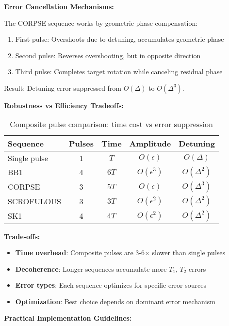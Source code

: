 \documentclass[11pt,a4paper]{article}
\theoremstyle{definition}
\theoremstyle{remark}
\begin{document}
\textbf{Error Cancellation Mechanisms:}

The CORPSE sequence works by geometric phase compensation:
\begin{enumerate}
    \item First pulse: Overshoots due to detuning, accumulates geometric phase
    \item Second pulse: Reverses overshooting, but in opposite direction
    \item Third pulse: Completes target rotation while canceling residual phase
\end{enumerate}

Result: Detuning error suppressed from $O(\Delta)$ to $O(\Delta^3)$.

\textbf{Robustness vs Efficiency Tradeoffs:}

\begin{table}[h]
\centering
\begin{tabular}{lcccc}
\toprule
\textbf{Sequence} & \textbf{Pulses} & \textbf{Time} & \textbf{Amplitude} & \textbf{Detuning} \\
\midrule
Single pulse & 1 & $T$ & $O(\epsilon)$ & $O(\Delta)$ \\
BB1 & 4 & $6T$ & $O(\epsilon^3)$ & $O(\Delta^2)$ \\
CORPSE & 3 & $5T$ & $O(\epsilon)$ & $O(\Delta^3)$ \\
SCROFULOUS & 3 & $3T$ & $O(\epsilon^2)$ & $O(\Delta^2)$ \\
SK1 & 4 & $4T$ & $O(\epsilon^2)$ & $O(\Delta^2)$ \\
\bottomrule
\end{tabular}
\caption{Composite pulse comparison: time cost vs error suppression}
\end{table}

\textbf{Trade-offs:}
\begin{itemize}
    \item \textbf{Time overhead}: Composite pulses are 3-6× slower than single pulses
    \item \textbf{Decoherence}: Longer sequences accumulate more $T_1$, $T_2$ errors
    \item \textbf{Error types}: Each sequence optimizes for specific error sources
    \item \textbf{Optimization}: Best choice depends on dominant error mechanism
\end{itemize}

\textbf{Practical Implementation Guidelines:}
\end{document}
